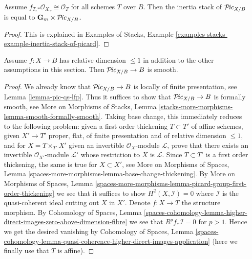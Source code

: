 \begin{lemma}
\label{lemma-pic-inertia}
Assume $f_{T, *}\mathcal{O}_{X_T} \cong \mathcal{O}_T$ for all
schemes $T$ over $B$. Then the inertia stack of $\mathcal{P}\!\mathit{ic}_{X/B}$
is equal to $\mathbf{G}_m \times \mathcal{P}\!\mathit{ic}_{X/B}$.
\end{lemma}

\begin{proof}
This is explained in Examples of Stacks, Example
\ref{examples-stacks-example-inertia-stack-of-picard}.
\end{proof}

\begin{lemma}
\label{lemma-pic-curves-smooth}
Assume $f : X \to B$ has relative dimension $\leq 1$ in addition to
the other assumptions in this section. Then $\mathcal{P}\!\mathit{ic}_{X/B} \to B$
is smooth.
\end{lemma}

\begin{proof}
We already know that $\mathcal{P}\!\mathit{ic}_{X/B} \to B$ is
locally of finite presentation, see Lemma \ref{lemma-pic-qs-lfp}.
Thus it suffices to show that $\mathcal{P}\!\mathit{ic}_{X/B} \to B$ is
formally smooth, see More on Morphisms of Stacks, Lemma
\ref{stacks-more-morphisms-lemma-smooth-formally-smooth}.
Taking base change, this immediately reduces to the following
problem: given a first order thickening $T \subset T'$
of affine schemes, given $X' \to T'$ proper, flat, of finite
presentation and of relative dimension $\leq 1$, and
for $X = T \times_{T'} X'$ given an invertible $\mathcal{O}_X$-module
$\mathcal{L}$, prove that there exists an invertible
$\mathcal{O}_{X'}$-module $\mathcal{L}'$ whose
restriction to $X$ is $\mathcal{L}$.
Since $T \subset T'$ is a first order thickening, the
same is true for $X \subset X'$, see
More on Morphisms of Spaces, Lemma
\ref{spaces-more-morphisms-lemma-base-change-thickening}.
By More on Morphisms of Spaces, Lemma
\ref{spaces-more-morphisms-lemma-picard-group-first-order-thickening}
we see that it suffices to show $H^2(X, \mathcal{I}) = 0$
where $\mathcal{I}$ is the quasi-coherent ideal cutting out $X$ in $X'$.
Denote $f : X \to T$ the structure morphism.
By Cohomology of Spaces, Lemma
\ref{spaces-cohomology-lemma-higher-direct-images-zero-above-dimension-fibre}
we see that $R^pf_*\mathcal{I} = 0$ for $p > 1$.
Hence we get the desired vanishing by
Cohomology of Spaces, Lemma
\ref{spaces-cohomology-lemma-quasi-coherence-higher-direct-images-application}
(here we finally use that $T$ is affine).
\end{proof}





